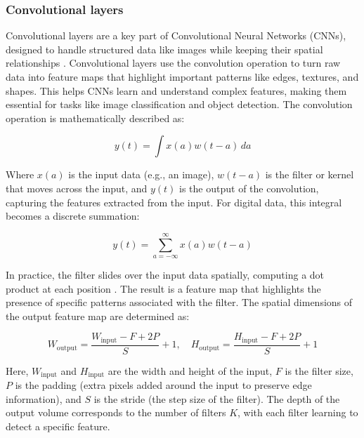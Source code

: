 \subsubsection{Convolutional layers}

Convolutional layers are a key part of Convolutional Neural Networks (CNNs), designed to handle structured data like images while keeping their spatial relationships \cite{cs231n_cnn}. Convolutional layers use the convolution operation to turn raw data into feature maps that highlight important patterns like edges, textures, and shapes. This helps CNNs learn and understand complex features, making them essential for tasks like image classification and object detection. The convolution operation is mathematically described as:

\begin{equation}
    y(t) = \int x(a)w(t-a) \, da
    \label{contionous_conv_operation}
\end{equation}

Where \( x(a) \) is the input data (e.g., an image), \( w(t-a) \) is the filter or kernel that moves across the input, and \( y(t) \) is the output of the convolution, capturing the features extracted from the input. For digital data, this integral becomes a discrete summation:

\begin{equation}
    y(t) = \sum_{a=-\infty}^{\infty} x(a)w(t-a)
\end{equation}


In practice, the filter slides over the input data spatially, computing a dot product at each position \cite{cs231n_cnn}. The result is a feature map that highlights the presence of specific patterns associated with the filter. 
The spatial dimensions of the output feature map are determined as:

\begin{equation}
    W_{\text{output}} = \frac{W_{\text{input}} - F + 2P}{S} + 1, \quad H_{\text{output}} = \frac{H_{\text{input}} - F + 2P}{S} + 1
    \label{conv_spatial}
\end{equation}


Here, \( W_{\text{input}} \) and \( H_{\text{input}} \) are the width and height of the input, \( F \) is the filter size, \( P \) is the padding (extra pixels added around the input to preserve edge information), and \( S \) is the stride (the step size of the filter). The depth of the output volume corresponds to the number of filters \( K \), with each filter learning to detect a specific feature.

